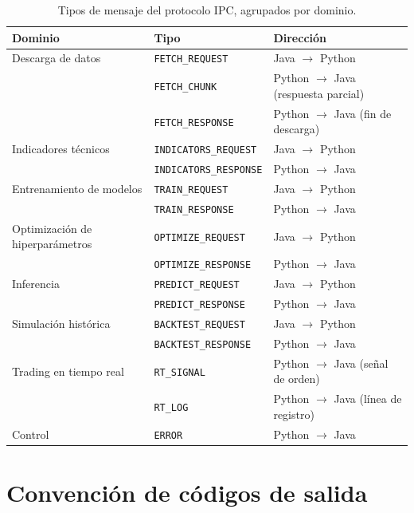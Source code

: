 \begin{table}[h]
\centering
\caption{Tipos de mensaje del protocolo IPC, agrupados por dominio.}
\label{tab:ipc-tipos}
\begin{tabular}{@{}lll@{}}
\toprule
\textbf{Dominio} & \textbf{Tipo} & \textbf{Dirección} \\
\midrule
Descarga de datos
    & \texttt{FETCH\_REQUEST}      & Java $\rightarrow$ Python \\
    & \texttt{FETCH\_CHUNK}        & Python $\rightarrow$ Java (respuesta parcial) \\
    & \texttt{FETCH\_RESPONSE}     & Python $\rightarrow$ Java (fin de descarga) \\
\midrule
Indicadores técnicos
    & \texttt{INDICATORS\_REQUEST}  & Java $\rightarrow$ Python \\
    & \texttt{INDICATORS\_RESPONSE} & Python $\rightarrow$ Java \\
\midrule
Entrenamiento de modelos
    & \texttt{TRAIN\_REQUEST}       & Java $\rightarrow$ Python \\
    & \texttt{TRAIN\_RESPONSE}      & Python $\rightarrow$ Java \\
\midrule
Optimización de hiperparámetros
    & \texttt{OPTIMIZE\_REQUEST}    & Java $\rightarrow$ Python \\
    & \texttt{OPTIMIZE\_RESPONSE}   & Python $\rightarrow$ Java \\
\midrule
Inferencia
    & \texttt{PREDICT\_REQUEST}     & Java $\rightarrow$ Python \\
    & \texttt{PREDICT\_RESPONSE}    & Python $\rightarrow$ Java \\
\midrule
Simulación histórica
    & \texttt{BACKTEST\_REQUEST}    & Java $\rightarrow$ Python \\
    & \texttt{BACKTEST\_RESPONSE}   & Python $\rightarrow$ Java \\
\midrule
Trading en tiempo real
    & \texttt{RT\_SIGNAL}           & Python $\rightarrow$ Java (señal de orden) \\
    & \texttt{RT\_LOG}              & Python $\rightarrow$ Java (línea de registro) \\
\midrule
Control
    & \texttt{ERROR}                & Python $\rightarrow$ Java \\
\bottomrule
\end{tabular}
\end{table}

\section*{Convención de códigos de salida}

